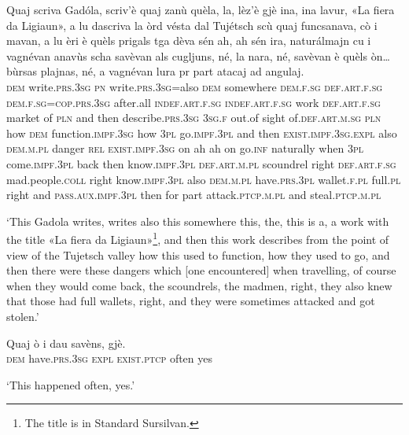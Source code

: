 \begin{linenumbers}
\gll Quaj scriva Gadóla, scriv’è quaj zanù quèla, la, lèz’è gjè ina, ina lavur, «La fiera da Ligiaun», a lu dascriva la òrd vésta dal Tujétsch scù quaj funcsanava, cò i mavan, a lu èri è quèls prigals tga dèva sén ah, ah sén ira, naturálmajn cu i vagnévan anavùs scha savèvan als cugljuns, né, la nara, né, savèvan è quèls òn… bùrsas plajnas, né, a vagnévan lura pr part atacaj ad angulaj.\\
\textsc{dem} write.\textsc{prs.3sg} \textsc{pn} write.\textsc{prs.3sg}=also \textsc{dem} somewhere \textsc{dem.f.sg} \textsc{def.art.f.sg} \textsc{dem.f.sg}=\textsc{cop.prs.3sg} after.all \textsc{indef.art.f.sg} \textsc{indef.art.f.sg} work \textsc{def.art.f.sg} market of \textsc{pln} and then describe.\textsc{prs.3sg} \textsc{3sg.f} out.of sight of.\textsc{def.art.m.sg} \textsc{pln} how \textsc{dem} function.\textsc{impf.3sg} how \textsc{3pl} go.\textsc{impf.3pl} and then  \textsc{exist.impf.3sg.expl} also \textsc{dem.m.pl} danger \textsc{rel} \textsc{exist.impf.3sg} on ah ah on go.\textsc{inf} naturally when \textsc{3pl} come.\textsc{impf.3pl} back then know.\textsc{impf.3pl} \textsc{def.art.m.pl} scoundrel right \textsc{def.art.f.sg} mad.people.\textsc{coll} right know.\textsc{impf.3pl} also \textsc{dem.m.pl} have.\textsc{prs.3pl} wallet.\textsc{f.pl} full.\textsc{pl} right and \textsc{pass.aux.impf.3pl} then for part attack.\textsc{ptcp.m.pl} and steal.\textsc{ptcp.m.pl} \\
\end{linenumbers}
\medskip
\glt `This Gadola writes, writes also this somewhere this, the, this is a, a work with the title «La fiera da Ligiaun»\footnote{The title is in Standard Sursilvan.}, and then this work describes from the point of view of the Tujetsch valley how this used to function, how they used to go, and then there were these dangers which [one encountered] when travelling, of course when they would come back, the scoundrels, the madmen, right, they also knew that those had full wallets, right, and they were sometimes attacked and got stolen.' 
\medskip

\begin{linenumbers}
\gll Quaj ò i dau savèns, gjè.\\
  \textsc{dem} have.\textsc{prs.3sg} \textsc{expl} \textsc{exist.ptcp} often yes\\
\end{linenumbers}
\medskip
\glt `This happened often, yes.'
\medskip

